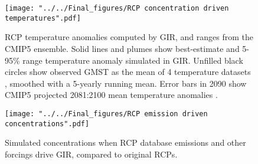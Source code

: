 \documentclass[gmd, manuscript]{copernicus}
\begin{document}
\begin{figure}[t]
    \texttt{[image: "../../Final\_figures/RCP concentration driven temperatures".pdf]}
    \caption{RCP temperature anomalies computed by GIR, and ranges from the CMIP5 ensemble. Solid lines and plumes show best-estimate and 5-95\% range temperature anomaly simulated in GIR. Unfilled black circles show observed GMST as the mean of 4 temperature datasets \citep{Vose2012,Cowtan2014,Lenssen2019,Morice2011}, smoothed with a 5-yearly running mean. Error bars in 2090 show CMIP5 projected 2081:2100 mean temperature anomalies \citep{Collins2013}.}
\end{figure}
\begin{figure}[t]
    \texttt{[image: "../../Final\_figures/RCP emission driven concentrations".pdf]}
    \caption{Simulated concentrations when RCP database emissions and other forcings drive GIR, compared to original RCPs.}
\end{figure}


\section{}












\end{document}
